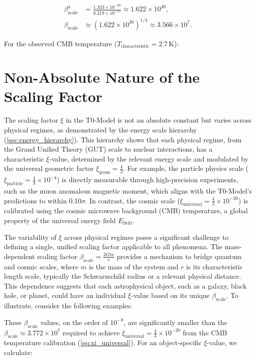 \documentclass[12pt,a4paper]{report}
\newcommand{\Efield}{E_{\text{field}}}
\newcommand{\xipar}{\xi}
\newcommand{\xiparticle}{\xi_{\text{particle}}}
\newcommand{\xiuniversal}{\xi_{\text{universal}}}
\newcommand{\xigeom}{\xi_{\text{geom}}}
\newcommand{\Tchar}{T_{\text{characteristic}}}
\newcommand{\betascale}{\beta_{\text{scale}}}
\theoremstyle{definition}
\begin{document}
	\begin{align}
		\betascale^4 &= \frac{1.333 \times 10^{-20}}{8.219 \times 10^{-51}} \approx 1.622 \times 10^{30}, \\
		\betascale &\approx (1.622 \times 10^{30})^{1/4} \approx 3.566 \times 10^7.
	\end{align}
	
	For the observed CMB temperature (\(\Tchar = 2.7 \, \text{K}\)):
	

	\section{Non-Absolute Nature of the Scaling Factor}
	\label{sec:non_absolute_scaling}
	
	The scaling factor \(\xipar\) in the T0-Model is not an absolute constant but varies across physical regimes, as demonstrated by the energy scale hierarchy (\cref{sec:energy_hierarchy}). This hierarchy shows that each physical regime, from the Grand Unified Theory (GUT) scale to nuclear interactions, has a characteristic \(\xipar\)-value, determined by the relevant energy scale and modulated by the universal geometric factor \(\xigeom = \frac{4}{3}\). For example, the particle physics scale (\(\xiparticle = \frac{4}{3} \times 10^{-4}\)) is directly measurable through high-precision experiments, such as the muon anomalous magnetic moment, which aligns with the T0-Model's predictions to within 0.10\(\sigma\). In contrast, the cosmic scale (\(\xiuniversal = \frac{4}{3} \times 10^{-20}\)) is calibrated using the cosmic microwave background (CMB) temperature, a global property of the universal energy field \(\Efield\).
	
	The variability of \(\xipar\) across physical regimes poses a significant challenge to defining a single, unified scaling factor applicable to all phenomena. The mass-dependent scaling factor \(\betascale = \frac{2Gm}{r}\) provides a mechanism to bridge quantum and cosmic scales, where \(m\) is the mass of the system and \(r\) is its characteristic length scale, typically the Schwarzschild radius or a relevant physical distance. This dependence suggests that each astrophysical object, such as a galaxy, black hole, or planet, could have an individual \(\xipar\)-value based on its unique \(\betascale\). To illustrate, consider the following examples:

	
	These \(\betascale\) values, on the order of \(10^{-8}\), are significantly smaller than the \(\betascale \approx 3.772 \times 10^7\) required to achieve \(\xiuniversal = \frac{4}{3} \times 10^{-20}\) from the CMB temperature calibration (\cref{eq:xi_universal}). For an object-specific \(\xipar\)-value, we calculate:
	
\end{document}
